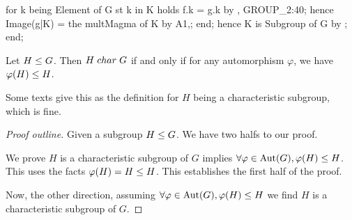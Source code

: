    for k being Element of G st k in K holds f.k = g.k by , GROUP_2:40;
    hence Image(g|K) = the multMagma of K by A1,;
  end;
  hence K is  Subgroup of G by ;
end;
\eatline
{}\nwendcode{}\nwdocspar
\begin{theorem}\label{thm:results:alt-def-of-char-subgroup}
  Let $H\leq G$.
  Then $H\mathrel{char} G$ if and only if for any automorphism $\varphi$, we have
  $\varphi(H)\leq H$.
\end{theorem}

Some texts give this as the definition for $H$ being a characteristic
subgroup, which is fine.

\begin{proof}[Proof outline]
  Given a subgroup $H\leq G$. We have two halfs to our proof.

We prove $H$ is a characteristic subgroup of $G$ implies
$\forall\varphi\in\operatorname{Aut}(G),\varphi(H)\leq H$. This uses the facts
$\varphi(H)=H\leq H$. This establishes the first half of the proof.

Now, the other direction, assuming
$\forall\varphi\in\operatorname{Aut}(G),\varphi(H)\leq H$ we find $H$ is a
characteristic subgroup of $G$.
\end{proof}

